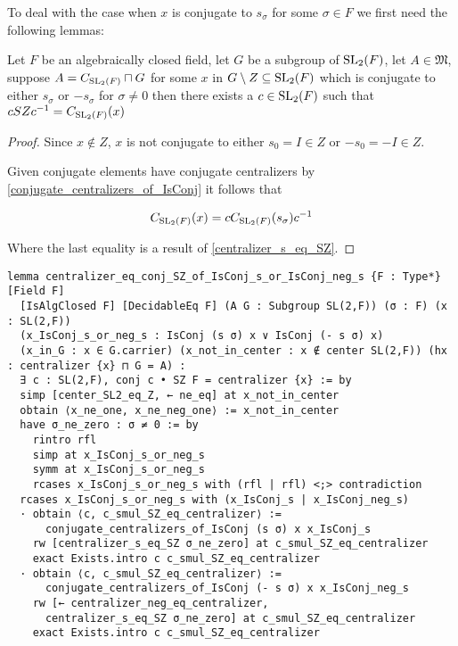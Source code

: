 To deal with the case when $x$ is conjugate to $s_\sigma$ for some $\sigma \in F$ we first need the following lemmas:

\begin{lemma}
  \label{MaximalAbelianSubgroup.centralizer_eq_conj_SZ_of_IsConj_s_or_IsConj_neg_s}
  \leanok

  Let $F$ be an algebraically closed field, let $G$ be a subgroup of $\operatorname{SL}_2(F)$, let $A \in \mathfrak{M}$, suppose $A = C_{\operatorname{SL}_2(F)}\sqcap G$ for some
  $x$ in $G \setminus Z \subseteq \operatorname{SL}_2(F)$ which is conjugate to either $s_\sigma$ or $-s_\sigma$ for $\sigma \ne 0$ then
  there exists a $c \in \operatorname{SL}_2(F)$ such that $cSZc^{-1} = C_{\operatorname{SL}_2(F)}(x)$
\end{lemma}
\begin{proof}
\leanok
Since $x \notin Z$, $x$ is not conjugate to either $s_0 = I \in Z$ or $-s_0 = -I \in Z$.

Given conjugate elements have conjugate centralizers by \ref{conjugate_centralizers_of_IsConj} it follows that 

\[
C_{\operatorname{SL}_2(F)}(x) = c C_{\operatorname{SL}_2(F)}(s_\sigma)c^{-1}
\]

Where the last equality is a result of \ref{centralizer_s_eq_SZ}.
\end{proof}
\begin{footnotesize}
\begin{verbatim}
lemma centralizer_eq_conj_SZ_of_IsConj_s_or_IsConj_neg_s {F : Type*} [Field F]
  [IsAlgClosed F] [DecidableEq F] (A G : Subgroup SL(2,F)) (σ : F) (x : SL(2,F))
  (x_IsConj_s_or_neg_s : IsConj (s σ) x ∨ IsConj (- s σ) x)
  (x_in_G : x ∈ G.carrier) (x_not_in_center : x ∉ center SL(2,F)) (hx : centralizer {x} ⊓ G = A) :
  ∃ c : SL(2,F), conj c • SZ F = centralizer {x} := by
  simp [center_SL2_eq_Z, ← ne_eq] at x_not_in_center
  obtain ⟨x_ne_one, x_ne_neg_one⟩ := x_not_in_center
  have σ_ne_zero : σ ≠ 0 := by
    rintro rfl
    simp at x_IsConj_s_or_neg_s
    symm at x_IsConj_s_or_neg_s
    rcases x_IsConj_s_or_neg_s with (rfl | rfl) <;> contradiction
  rcases x_IsConj_s_or_neg_s with (x_IsConj_s | x_IsConj_neg_s)
  · obtain ⟨c, c_smul_SZ_eq_centralizer⟩ :=
      conjugate_centralizers_of_IsConj (s σ) x x_IsConj_s
    rw [centralizer_s_eq_SZ σ_ne_zero] at c_smul_SZ_eq_centralizer
    exact Exists.intro c c_smul_SZ_eq_centralizer
  · obtain ⟨c, c_smul_SZ_eq_centralizer⟩ :=
      conjugate_centralizers_of_IsConj (- s σ) x x_IsConj_neg_s
    rw [← centralizer_neg_eq_centralizer,
      centralizer_s_eq_SZ σ_ne_zero] at c_smul_SZ_eq_centralizer
    exact Exists.intro c c_smul_SZ_eq_centralizer
\end{verbatim}
\end{footnotesize}

